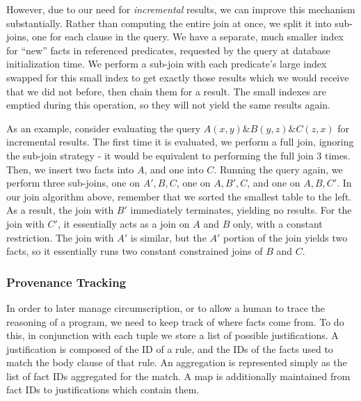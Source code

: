 However, due to our need for \emph{incremental} results, we can improve this mechanism substantially.
Rather than computing the entire join at once, we split it into sub-joins, one for each clause in the query.
We have a separate, much smaller index for ``new'' facts in referenced predicates, requested by the query at database initialization time.
We perform a sub-join with each predicate's large index swapped for this small index to get exactly those results which we would receive that we did not before, then chain them for a result.
The small indexes are emptied during this operation, so they will not yield the same results again.

As an example, consider evaluating the query $A(x, y) \& B(y, z) \& C(z, x)$ for incremental results.
The first time it is evaluated, we perform a full join, ignoring the sub-join strategy - it would be equivalent to performing the full join 3 times.
Then, we insert two facts into $A$, and one into $C$.
Running the query again, we perform three sub-joins, one on $A', B, C$, one on $A, B', C$, and one on $A, B, C'$.
In our join algorithm above, remember that we sorted the smallest table to the left.
As a result, the join with $B'$ immediately terminates, yielding no results.
For the join with $C'$, it essentially acts as a join on $A$ and $B$ only, with a constant restriction.
The join with $A'$ is similar, but the $A'$ portion of the join yields two facts, so it essentially runs two constant constrained joins of $B$ and $C$.

\subsubsection{Provenance Tracking}
In order to later manage circumscription, or to allow a human to trace the reasoning of a program, we need to keep track of where facts come from.
To do this, in conjunction with each tuple we store a list of possible justifications.
A justification is composed of the ID of a rule, and the IDs of the facts used to match the body clause of that rule.
An aggregation is represented simply as the list of fact IDs aggregated for the match.
A map is additionally maintained from fact IDs to justifications which contain them.

